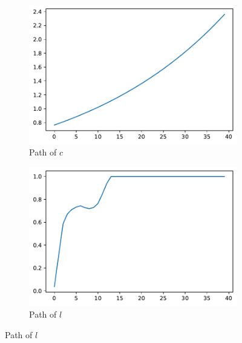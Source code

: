 \documentclass[12pt]{article}
\begin{document}
\begin{figure}[h]
    \begin{subfigure}{.5\textwidth}
      \centering
      \includegraphics[width=.8\linewidth]{../../output/shooting_c_path.pdf}  
      \caption{Path of $c$}
      \label{fig:c_path}
    \end{subfigure}
    \begin{subfigure}{.5\textwidth}
      \centering
      \includegraphics[width=.8\linewidth]{../../output/shooting_l_path.pdf}  
      \caption{Path of $l$}
      \label{fig:l_path}
    \end{subfigure}
    

\end{figure}
\end{document}
